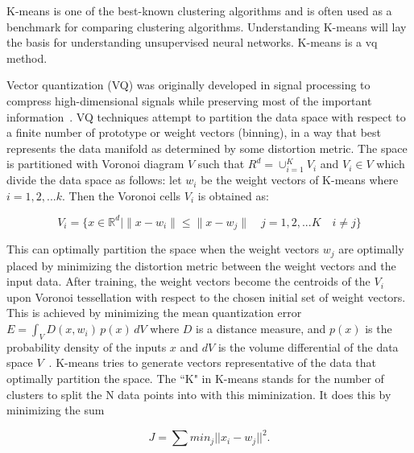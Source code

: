 
K-means is one of the best-known clustering algorithms and is often used as a benchmark for comparing clustering algorithms. Understanding K-means \cite{1094577} will lay the basis for understanding unsupervised neural networks. K-means is a \acrfull{vq} method. 

Vector quantization (VQ) was originally developed in signal processing to compress high-dimensional signals while preserving most of the important information~\cite{MacQueen1967KMeans, Lloyd1982KMeans}. VQ techniques attempt to partition the data space with respect to a finite number of prototype or weight vectors (binning), in a way that best represents the data manifold as determined by some distortion metric. The space is partitioned with Voronoi diagram $V$ such that $R^d = \cup_{i=1}^K V_i$ and $V_i \in V$ which divide the data space as follows: let $w_i$ be the weight vectors of K-means where $i =1,2,...k$. Then the Voronoi
cells $V_i$ is obtained as:

\begin{equation}
    V_i=\{x \in \mathbb{R}^d | \|x-w_i\| \leq \|x-w_j\| \quad j=1,2,...K \quad i\neq j \} \label{eq:voronoi_cells}
\end{equation}

This can optimally partition the space when the weight vectors $w_j$ are optimally placed by minimizing the distortion metric between the weight vectors and the input data.
After training, the weight vectors become the centroids of the $V_i$ upon Voronoi tessellation with respect to the chosen initial set of weight vectors.
This is achieved by minimizing the mean quantization error $E = \int_V D(x, w_i) \, p(x) \, dV$ where $D$ is a distance measure, and $p(x)$ is the probability density of the inputs $x$ and $dV$ is the volume differential of the data space $V$~\cite{Kohonen2013SOM}. K-means tries to generate vectors representative of the data that optimally partition the space. The ``K" in K-means stands for the number of clusters to split the N data points into with this miminization. It does this by minimizing the sum 

\begin{equation}
J = \sum min_j||x_i - w_j||^2.
\end{equation}

